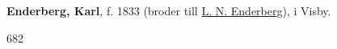 \textbf{Enderberg, Karl}, f. 1833 (broder till \href{Enderberg-L-N}{L. N. Enderberg}), i Visby.

682 
